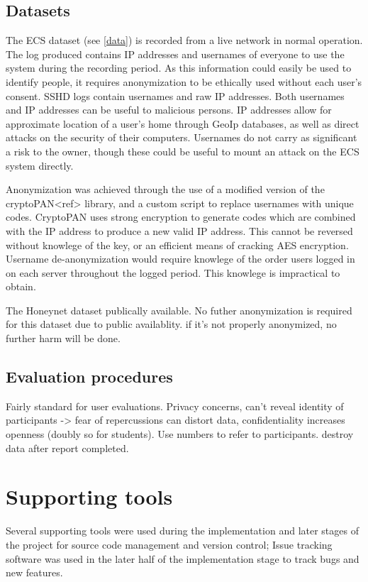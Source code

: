 \subsection{Datasets}
The ECS dataset (see \ref{data}) is recorded from a live network in normal operation. The log produced contains IP addresses and usernames of everyone to use the system during the recording period. As this information could easily be used to identify people, it requires anonymization to be ethically used without each user's consent. SSHD logs contain usernames and raw IP addresses. Both usernames and IP addresses can be useful to malicious persons. IP addresses allow for approximate location of a user's home through GeoIp databases, as well as direct attacks on the security of their computers. Usernames do not carry as significant a risk to the owner, though these could be useful to mount an attack on the ECS system directly. 

Anonymization was achieved through the use of a modified version of the cryptoPAN<ref> library, and a custom script to replace usernames with unique codes. CryptoPAN uses strong encryption to generate codes which are combined with the IP address to produce a new valid IP address. This cannot be reversed without knowlege of the key, or an efficient means of cracking AES encryption. Username de-anonymization would require knowlege of the order users logged in on each server throughout the logged period. This knowlege is impractical to obtain. 

The Honeynet dataset publically available. No futher anonymization is required for this dataset due to public availablity. if it's not properly anonymized, no further harm will be done. 

\subsection{Evaluation procedures}
Fairly standard for user evaluations. Privacy concerns, can't reveal identity of participants -> fear of repercussions can distort data, confidentiality increases openness (doubly so for students). 
Use numbers to refer to participants. destroy data after report completed. 

\section{Supporting tools}
Several supporting tools were used during the implementation and later stages of the project for source code management and version control; Issue tracking software was used in the later half of the implementation stage to track bugs and new features.

